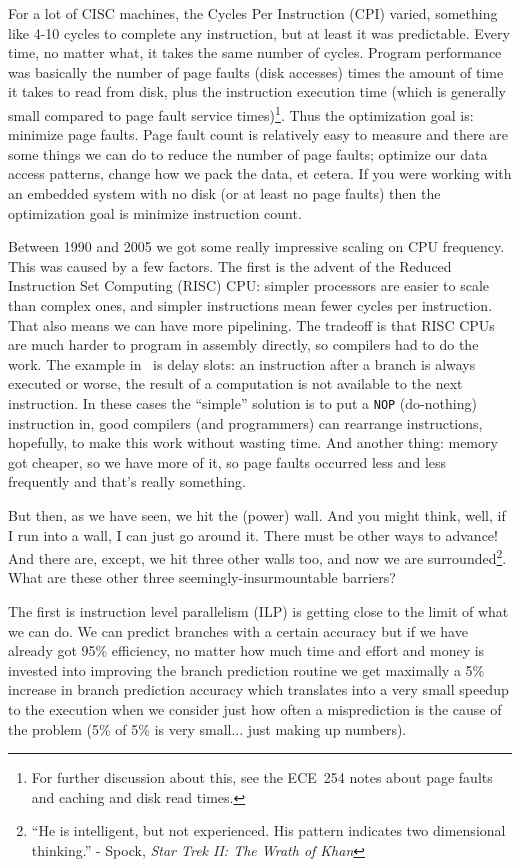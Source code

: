 \documentclass[a4paper]{report}
\begin{document}
For a lot of CISC machines, the Cycles Per Instruction (CPI) varied, something like 4-10 cycles to complete any instruction, but at least it was predictable. Every time, no matter what, it takes the same number of cycles. Program performance was basically the number of page faults (disk accesses) times the amount of time it takes to read from disk, plus the instruction execution time (which is generally small compared to page fault service times)\footnote{For further discussion about this, see the ECE~254 notes about page faults and caching and disk read times.}. Thus the optimization goal is: minimize page faults. Page fault count is relatively easy to measure and there are some things we can do to reduce the number of page faults; optimize our data access patterns, change how we pack the data, et cetera. If you were working with an embedded system with no disk (or at least no page faults) then the optimization goal is minimize instruction count.

Between 1990 and 2005 we got some really impressive scaling on CPU frequency. This was caused by a few factors. The first is the advent of the Reduced Instruction Set Computing (RISC) CPU: simpler processors are easier to scale than complex ones, and simpler instructions mean fewer cycles per instruction. That also means we can have more pipelining. The tradeoff is that RISC CPUs are much harder to program in assembly directly, so compilers had to do the work. The example in~\cite{modern-hardware} is delay slots: an instruction after a branch is always executed or worse, the result of a computation is not available to the next instruction. In these cases the ``simple'' solution is to put a \texttt{NOP} (do-nothing) instruction in, good compilers (and programmers) can rearrange instructions, hopefully, to make this work without wasting time. And another thing: memory got cheaper, so we have more of it, so page faults occurred less and less frequently and that's really something.

But then, as we have seen, we hit the (power) wall. And you might think, well, if I run into a wall, I can just go around it. There must be other ways to advance! And there are, except, we hit three other walls too, and now we are surrounded\footnote{``He is intelligent, but not experienced. His pattern indicates two dimensional thinking.'' - Spock, \textit{Star Trek II: The Wrath of Khan}}. What are these other three seemingly-insurmountable barriers?

The first is instruction level parallelism (ILP) is getting close to the limit of what we can do. We can predict branches with a certain accuracy but if we have already got 95\% efficiency, no matter how much time and effort and money is invested into improving the branch prediction routine we get maximally a 5\% increase in branch prediction accuracy which translates into a very small speedup to the execution when we consider just how often a misprediction is the cause of the problem (5\% of 5\% is very small... just making up numbers).
\end{document}
